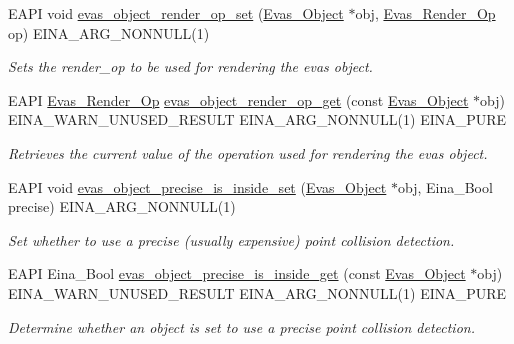 \begin{DoxyCompactItemize}
EAPI void \hyperlink{group__Evas__Object__Group__Extras_ga86ef8d1f039bff1a60595688f93a7990}{evas\_\-object\_\-render\_\-op\_\-set} (\hyperlink{group__Evas__Object__Group_ga9e19e6dd1f517a0ba437c0114d3e7c97}{Evas\_\-Object} $\ast$obj, \hyperlink{group__Evas__Object__Group__Extras_ga9c39a3ca795bbec3687fae9ee67d6056}{Evas\_\-Render\_\-Op} op) EINA\_\-ARG\_\-NONNULL(1)
\begin{DoxyCompactList}\small\item\em Sets the render\_\-op to be used for rendering the evas object. \item\end{DoxyCompactList}\item 
EAPI \hyperlink{group__Evas__Object__Group__Extras_ga9c39a3ca795bbec3687fae9ee67d6056}{Evas\_\-Render\_\-Op} \hyperlink{group__Evas__Object__Group__Extras_gaa157afa6f23cdf4b344d95531bb7d508}{evas\_\-object\_\-render\_\-op\_\-get} (const \hyperlink{group__Evas__Object__Group_ga9e19e6dd1f517a0ba437c0114d3e7c97}{Evas\_\-Object} $\ast$obj) EINA\_\-WARN\_\-UNUSED\_\-RESULT EINA\_\-ARG\_\-NONNULL(1) EINA\_\-PURE
\begin{DoxyCompactList}\small\item\em Retrieves the current value of the operation used for rendering the evas object. \item\end{DoxyCompactList}\item 
EAPI void \hyperlink{group__Evas__Object__Group__Extras_gac9ce9802afd7d4cba580fbcbe92c28b2}{evas\_\-object\_\-precise\_\-is\_\-inside\_\-set} (\hyperlink{group__Evas__Object__Group_ga9e19e6dd1f517a0ba437c0114d3e7c97}{Evas\_\-Object} $\ast$obj, Eina\_\-Bool precise) EINA\_\-ARG\_\-NONNULL(1)
\begin{DoxyCompactList}\small\item\em Set whether to use a precise (usually expensive) point collision detection. \item\end{DoxyCompactList}\item 
EAPI Eina\_\-Bool \hyperlink{group__Evas__Object__Group__Extras_ga8483a3c855f466a5dca480fcfd07b52b}{evas\_\-object\_\-precise\_\-is\_\-inside\_\-get} (const \hyperlink{group__Evas__Object__Group_ga9e19e6dd1f517a0ba437c0114d3e7c97}{Evas\_\-Object} $\ast$obj) EINA\_\-WARN\_\-UNUSED\_\-RESULT EINA\_\-ARG\_\-NONNULL(1) EINA\_\-PURE
\begin{DoxyCompactList}\small\item\em Determine whether an object is set to use a precise point collision detection. \item\end{DoxyCompactList}\item 

\end{DoxyCompactItemize}
